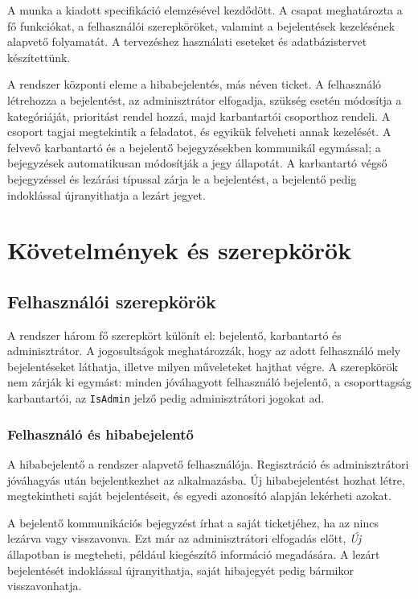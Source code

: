 \documentclass[12pt, a4paper, twoside]{article}
\begin{document}
A munka a kiadott specifikáció elemzésével kezdődött. A csapat meghatározta a fő funkciókat, a felhasználói szerepköröket, valamint a bejelentések kezelésének alapvető folyamatát. A tervezéshez használati eseteket és adatbázistervet készítettünk.

A rendszer központi eleme a hibabejelentés, más néven ticket. A felhasználó létrehozza a bejelentést, az adminisztrátor elfogadja, szükség esetén módosítja a kategóriáját, prioritást rendel hozzá, majd karbantartói csoporthoz rendeli. A csoport tagjai megtekintik a feladatot, és egyikük felveheti annak kezelését. A felvevő karbantartó és a bejelentő bejegyzésekben kommunikál egymással; a bejegyzések automatikusan módosítják a jegy állapotát. A karbantartó végső bejegyzéssel és lezárási típussal zárja le a bejelentést, a bejelentő pedig indoklással újranyithatja a lezárt jegyet.

\section{Követelmények és szerepkörök}

\subsection{Felhasználói szerepkörök}

A rendszer három fő szerepkört különít el: bejelentő, karbantartó és adminisztrátor. A jogosultságok meghatározzák, hogy az adott felhasználó mely bejelentéseket láthatja, illetve milyen műveleteket hajthat végre. A szerepkörök nem zárják ki egymást: minden jóváhagyott felhasználó bejelentő, a csoporttagság karbantartói, az \texttt{IsAdmin} jelző pedig adminisztrátori jogokat ad.

\subsubsection{Felhasználó és hibabejelentő}

A hibabejelentő a rendszer alapvető felhasználója. Regisztráció és adminisztrátori jóváhagyás után bejelentkezhet az alkalmazásba. Új hibabejelentést hozhat létre, megtekintheti saját bejelentéseit, és egyedi azonosító alapján lekérheti azokat.

A bejelentő kommunikációs bejegyzést írhat a saját ticketjéhez, ha az nincs lezárva vagy visszavonva. Ezt már az adminisztrátori elfogadás előtt, \textit{Új} állapotban is megteheti, például kiegészítő információ megadására. A lezárt bejelentését indoklással újranyithatja, saját hibajegyét pedig bármikor visszavonhatja.
\end{document}
